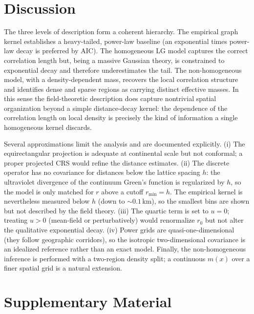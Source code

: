 \section{Discussion}

The three levels of description form a coherent hierarchy. The empirical graph kernel establishes a heavy-tailed,
power-law baseline (an exponential times power-law decay is preferred by AIC). The homogeneous LG model captures
the correct correlation length but, being a massive
Gaussian theory, is constrained to exponential decay and therefore underestimates the tail. The non-homogeneous
model, with a density-dependent mass, recovers the local correlation structure and identifies dense and
sparse regions as carrying distinct effective masses. In this sense the field-theoretic description does capture
nontrivial spatial organization beyond a simple distance-decay kernel: the dependence of the correlation length
on local density is precisely the kind of information a single homogeneous kernel discards.

\noindent Several approximations limit the analysis and are documented explicitly. (i) The equirectangular projection is
adequate at continental scale but not conformal; a proper projected CRS would refine the distance estimates.
(ii) The discrete operator has no covariance for distances below the lattice spacing $h$: the ultraviolet
divergence of the continuum Green's function is regularized by $h$, so the model is only matched for $r$ above a
cutoff $r_{\min}=h$. The empirical kernel is nevertheless measured below $h$ (down to $\sim0.1$\,km), so the
smallest bins are shown but not described by the field theory. (iii) The
quartic term is set to $u=0$; treating $u>0$ (mean-field or perturbatively) would renormalize $r_0$ but not alter
the qualitative exponential decay. (iv) Power grids are quasi-one-dimensional (they follow geographic
corridors), so the isotropic two-dimensional covariance is an idealized reference rather than an exact model.
Finally, the non-homogeneous inference is performed with a two-region density split; a continuous $m(x)$ over a
finer spatial grid is a natural extension.

\newpage

\section{Supplementary Material}

\label{sec:appendix2}

